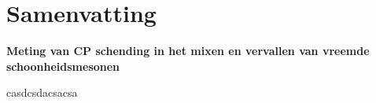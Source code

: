 \chapter*{Samenvatting}

{\Large\bf
  Meting van CP schending in het mixen en vervallen van vreemde schoonheidsmesonen
}
\vspace*{0.05\textwidth}

\noindent
casdcsdacsacsa
